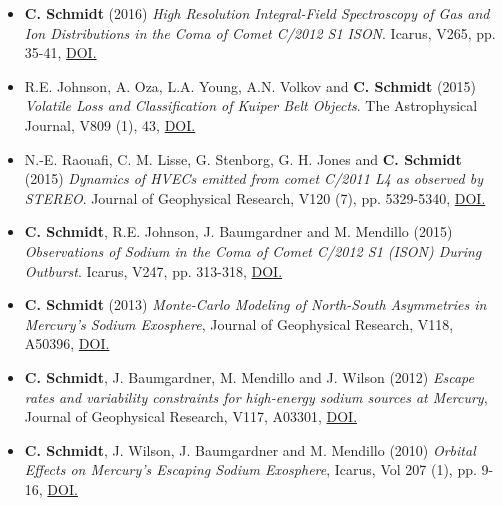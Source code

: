 \documentclass[12pt]{report}
\begin{document}
\begin{itemize}
  \item \textbf{C. Schmidt} (2016) \textit{High Resolution Integral-Field Spectroscopy of Gas and Ion Distributions in the Coma of Comet C/2012 S1 ISON}. Icarus, V265, pp. 35-41, \href{https://doi.org/10.1016/j.icarus.2015.10.009}{DOI.}
  \item R.E. Johnson, A. Oza, L.A. Young, A.N. Volkov and \textbf{C. Schmidt} (2015) \textit{Volatile Loss and Classification of Kuiper Belt Objects}. The Astrophysical Journal, V809 (1), 43, \href{https://doi.org/10.1088/0004-637X/809/1/43}{DOI.}
  \item N.-E. Raouafi, C. M. Lisse, G. Stenborg, G. H. Jones and \textbf{C. Schmidt} (2015) \textit{Dynamics of HVECs emitted from comet C/2011 L4 as observed by STEREO}. Journal of Geophysical Research, V120 (7), pp. 5329-5340, \href{https://doi.org/10.1002/2014JA020926}{DOI.}
  \item \textbf{C. Schmidt}, R.E. Johnson, J. Baumgardner and M. Mendillo (2015) \textit{Observations of Sodium in the Coma of Comet C/2012 S1 (ISON) During Outburst}. Icarus, V247, pp. 313-318, \href{https://doi.org/10.1016/j.icarus.2014.10.022}{DOI.}
  \item \textbf{C. Schmidt} (2013) \textit{Monte-Carlo Modeling of North-South Asymmetries in Mercury's Sodium Exosphere}, Journal of Geophysical Research, V118, A50396, \href{https://doi.org/10.1002/jgra.50396}{DOI.}
  \item \textbf{C. Schmidt}, J. Baumgardner, M. Mendillo and J. Wilson (2012) \textit{Escape rates and variability constraints for high-energy sodium sources at Mercury}, Journal of Geophysical Research, V117, A03301, \href{https://doi.org/10.1029/2011JA017217}{DOI.}
  \item \textbf{C. Schmidt}, J. Wilson, J. Baumgardner and M. Mendillo (2010) \textit{Orbital Effects on Mercury's Escaping Sodium Exosphere}, Icarus, Vol 207 (1), pp. 9-16, \href{https://doi.org/10.1016/j.icarus.2009.10.017}{DOI.} \label{totaljournalarticles}
 \end{itemize}
\end{document}
